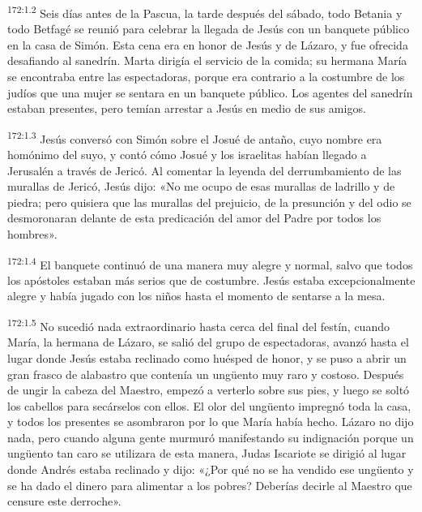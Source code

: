\par 
\textsuperscript{172:1.2} Seis días antes de la Pascua, la tarde después del sábado, todo Betania y todo Betfagé se reunió para celebrar la llegada de Jesús con un banquete público en la casa de Simón. Esta cena era en honor de Jesús y de Lázaro, y fue ofrecida desafiando al sanedrín. Marta dirigía el servicio de la comida; su hermana María se encontraba entre las espectadoras, porque era contrario a la costumbre de los judíos que una mujer se sentara en un banquete público. Los agentes del sanedrín estaban presentes, pero temían arrestar a Jesús en medio de sus amigos.

\par 
\textsuperscript{172:1.3} Jesús conversó con Simón sobre el Josué de antaño, cuyo nombre era homónimo del suyo, y contó cómo Josué y los israelitas habían llegado a Jerusalén a través de Jericó. Al comentar la leyenda del derrumbamiento de las murallas de Jericó, Jesús dijo: «No me ocupo de esas murallas de ladrillo y de piedra; pero quisiera que las murallas del prejuicio, de la presunción y del odio se desmoronaran delante de esta predicación del amor del Padre por todos los hombres».

\par 
\textsuperscript{172:1.4} El banquete continuó de una manera muy alegre y normal, salvo que todos los apóstoles estaban más serios que de costumbre. Jesús estaba excepcionalmente alegre y había jugado con los niños hasta el momento de sentarse a la mesa.

\par 
\textsuperscript{172:1.5} No sucedió nada extraordinario hasta cerca del final del festín, cuando María, la hermana de Lázaro, se salió del grupo de espectadoras, avanzó hasta el lugar donde Jesús estaba reclinado como huésped de honor, y se puso a abrir un gran frasco de alabastro que contenía un ung\"uento muy raro y costoso. Después de ungir la cabeza del Maestro, empezó a verterlo sobre sus pies, y luego se soltó los cabellos para secárselos con ellos. El olor del ung\"uento impregnó toda la casa, y todos los presentes se asombraron por lo que María había hecho. Lázaro no dijo nada, pero cuando alguna gente murmuró manifestando su indignación porque un ung\"uento tan caro se utilizara de esta manera, Judas Iscariote se dirigió al lugar donde Andrés estaba reclinado y dijo: «¿Por qué no se ha vendido ese ung\"uento y se ha dado el dinero para alimentar a los pobres? Deberías decirle al Maestro que censure este derroche».

